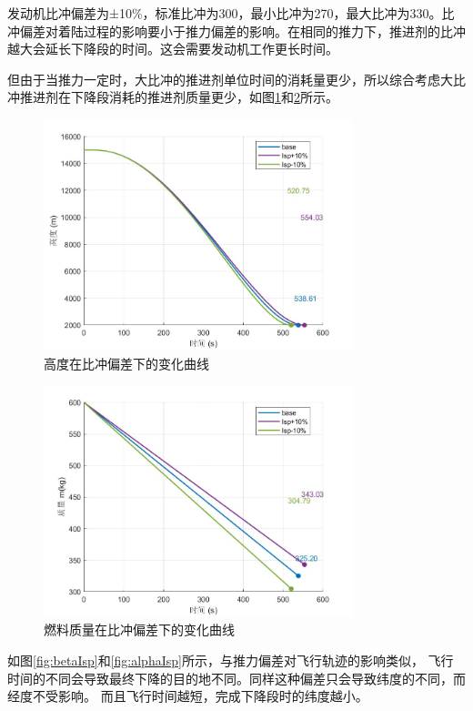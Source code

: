 \documentclass[12pt,a4paper]{article}
\begin{document}
发动机比冲偏差为±10\%，标准比冲为300，最小比冲为270，最大比冲为330。比冲偏差对着陆过程的影响要小于推力偏差的影响。在相同的推力下，推进剂的比冲越大会延长下降段的时间。这会需要发动机工作更长时间。

但由于当推力一定时，大比冲的推进剂单位时间的消耗量更少，所以综合考虑大比冲推进剂在下降段消耗的推进剂质量更少，如图\ref{fig:altIsp}和\ref{fig:mIsp}所示。

\begin{figure}[H]
\centering
\includegraphics[width=0.8\textwidth]{figures/altitude_Isp.jpg}
\caption{高度在比冲偏差下的变化曲线}
\label{fig:altIsp}
\end{figure}

\begin{figure}[H]
\centering
\includegraphics[width=0.8\textwidth]{figures/m_Isp.jpg}
\caption{燃料质量在比冲偏差下的变化曲线}
\label{fig:mIsp}
\end{figure}

如图\ref{fig:betaIsp}和\ref{fig:alphaIsp}所示，与推力偏差对飞行轨迹的影响类似，
飞行时间的不同会导致最终下降的目的地不同。同样这种偏差只会导致纬度的不同，而经度不受影响。
而且飞行时间越短，完成下降段时的纬度越小。
\end{document}
